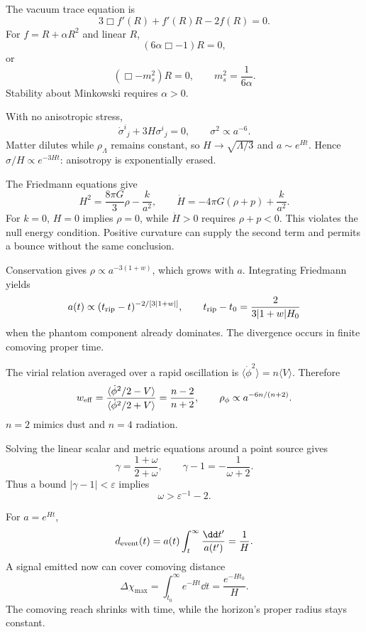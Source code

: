 \begin{solution}
The vacuum trace equation is
\[
3\Box f'(R)+f'(R)R-2f(R)=0.
\]
For \(f=R+\alpha R^2\) and linear \(R\),
\[
(6\alpha\Box-1)R=0,
\]
or
\[
(\Box-m_s^2)R=0,\qquad m_s^2=\frac1{6\alpha}.
\]
Stability about Minkowski requires \(\alpha>0\).
\end{solution}

\begin{solution}
With no anisotropic stress,
\[
\dot\sigma^i{}_j+3H\sigma^i{}_j=0,
\qquad \sigma^2\propto a^{-6}.
\]
Matter dilutes while \(\rho_\Lambda\) remains constant, so
\(H\to\sqrt{\Lambda/3}\) and \(a\sim e^{Ht}\).  Hence
\(\sigma/H\propto e^{-3Ht}\): anisotropy is exponentially erased.
\end{solution}

\begin{solution}
The Friedmann equations give
\[
H^2=\frac{8\pi G}{3}\rho-\frac{k}{a^2},\qquad
\dot H=-4\pi G(\rho+p)+\frac{k}{a^2}.
\]
For \(k=0\), \(H=0\) implies \(\rho=0\), while \(\dot H>0\) requires
\(\rho+p<0\).  This violates the null energy condition.  Positive curvature
can supply the second term and permits a bounce without the same conclusion.
\end{solution}

\begin{solution}
Conservation gives \(\rho\propto a^{-3(1+w)}\), which grows with \(a\).
Integrating Friedmann yields
\[
a(t)\propto(t_{\rm rip}-t)^{-2/[3|1+w|]},
\qquad
t_{\rm rip}-t_0=\frac{2}{3|1+w|H_0}
\]
when the phantom component already dominates.  The divergence occurs in
finite comoving proper time.
\end{solution}

\begin{solution}
The virial relation averaged over a rapid oscillation is
\(\langle\dot\phi^2\rangle=n\langle V\rangle\).  Therefore
\[
w_{\rm eff}
=\frac{\langle\dot\phi^2/2-V\rangle}
{\langle\dot\phi^2/2+V\rangle}
=\frac{n-2}{n+2},
\qquad
\rho_\phi\propto a^{-6n/(n+2)}.
\]
\(n=2\) mimics dust and \(n=4\) radiation.
\end{solution}

\begin{solution}
Solving the linear scalar and metric equations around a point source gives
\[
\gamma=\frac{1+\omega}{2+\omega},
\qquad
\gamma-1=-\frac1{\omega+2}.
\]
Thus a bound \(|\gamma-1|<\varepsilon\) implies
\[
\omega>\varepsilon^{-1}-2.
\]
\end{solution}

\begin{solution}
For \(a=e^{Ht}\),
\[
d_{\rm event}(t)=a(t)\int_t^\infty\frac{\dd t'}{a(t')}=\frac1H.
\]
A signal emitted now can cover comoving distance
\[
\Delta\chi_{\max}=\int_{t_0}^\infty e^{-Ht}\dd t
=\frac{e^{-Ht_0}}{H}.
\]
The comoving reach shrinks with time, while the horizon's proper radius stays
constant.
\end{solution}

